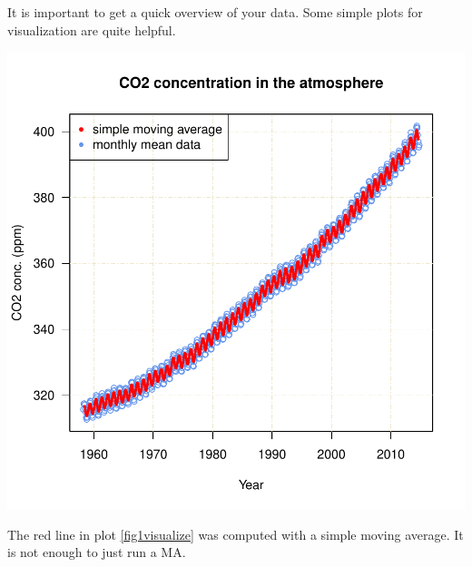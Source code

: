\documentclass[11pt, a4paper]{article} %
\begin{document}
It is important to get a quick overview of your data. Some simple plots for visualization are quite helpful. 

\includegraphics{sweave-fig1visualize}

The red line in plot \ref{fig1visualize} was computed with a simple moving average. It is not enough to just run a MA. 






\clearpage
 
\end{document}
